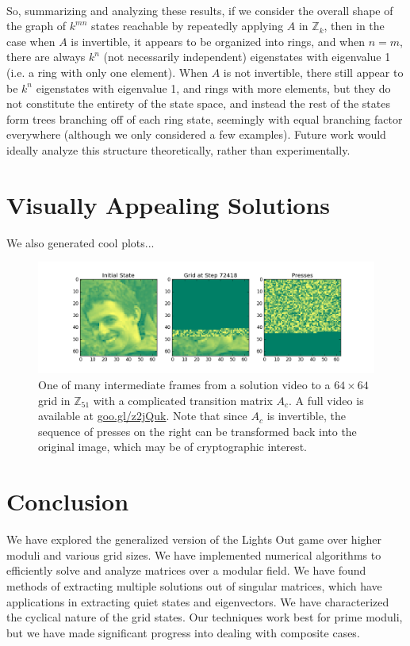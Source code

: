 \documentclass[11pt]{article}
\newcommand{\modZ}[1]{$\mathbb{Z}_{#1}$}
\begin{document}
\paragraph{} So, summarizing and analyzing these results, if we consider the overall shape of the graph of $k^{mn}$ states reachable by repeatedly applying $A$ in \modZ{k}, then in the case when $A$ is invertible, it appears to be organized into rings, and when $n=m$, there are always $k^n$ (not necessarily independent) eigenstates with eigenvalue 1 (i.e. a ring with only one element). When $A$ is not invertible, there still appear to be $k^n$ eigenstates with eigenvalue 1, and rings with more elements, but they do not constitute the entirety of the state space, and instead the rest of the states form trees branching off of each ring state, seemingly with equal branching factor everywhere (although we only considered a few examples). Future work would ideally analyze this structure theoretically, rather than experimentally.

\section*{Visually Appealing Solutions}

We also generated cool plots...

\begin{figure}[H]
  \caption{One of many intermediate frames from a solution video to a $64 \times 64$ grid in \modZ{51} with a complicated transition matrix $A_c$. A full video is available at \href{https://goo.gl/z2jQuk}{goo.gl/z2jQuk}. Note that since $A_c$ is invertible, the sequence of presses on the right can be transformed back into the original image, which may be of cryptographic interest.}
  \label{chr-solution}
  \includegraphics[width=\textwidth]{img000072418.png}
\end{figure}

\section*{Conclusion}
We have explored the generalized version of the Lights Out game over higher moduli and various grid sizes.  We have implemented numerical algorithms to efficiently solve and analyze matrices over a modular field.  We have found methods of extracting multiple solutions out of singular matrices, which have applications in extracting quiet states and eigenvectors.  We have characterized the cyclical nature of the grid states.  Our techniques work best for prime moduli, but we have made significant progress into dealing with composite cases.
\end{document}
